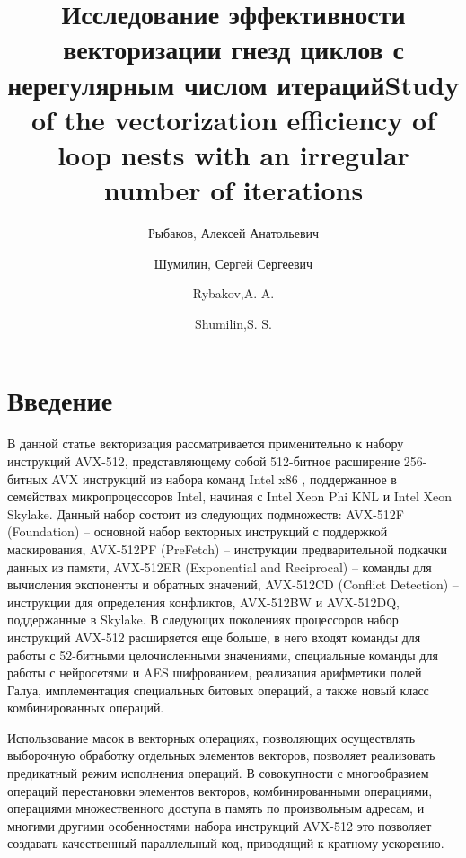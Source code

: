 \documentclass[utf8]{psta}
\title[исследование эффективности векторизации]{Исследование эффективности векторизации гнезд циклов с нерегулярным числом итераций}
\author{Рыбаков, Алексей Анатольевич}
\author{Шумилин, Сергей Сергеевич}
\title[Study of the vectorization efficiency]{Study of the vectorization efficiency of loop nests with an irregular number of iterations}
\author{Rybakov,A. A.}
\author{Shumilin,S. S.}
\begin{document}
           
\maketitle   

\section*{Введение}

В данной статье векторизация рассматривается применительно к набору инструкций AVX-512, представляющему собой 512-битное расширение 256-битных AVX инструкций из набора команд Intel x86 \cite{intel_manual}, поддержанное в семействах микропроцессоров Intel, начиная с Intel Xeon Phi KNL \cite{Jeffers} и Intel Xeon Skylake. 
Данный набор состоит из следующих подмножеств: AVX-512F (Foundation) -- основной набор векторных инструкций с поддержкой маскирования, AVX-512PF (PreFetch) -- инструкции предварительной подкачки данных из памяти, AVX-512ER (Exponential and Reciprocal) -- команды для вычисления экспоненты и обратных значений, AVX-512CD (Conflict Detection) -- инструкции для определения конфликтов, AVX-512BW и AVX-512DQ, поддержанные в Skylake. 
В следующих поколениях процессоров набор инструкций AVX-512 расширяется еще больше, в него входят команды для работы с 52-битными целочисленными значениями, специальные команды для работы с нейросетями и AES шифрованием, реализация арифметики полей Галуа, имплементация специальных битовых операций, а также новый класс комбинированных операций.

Использование масок в векторных операциях, позволяющих осуществлять выборочную обработку отдельных элементов векторов, позволяет реализовать предикатный режим исполнения операций. 
В совокупности с многообразием операций перестановки элементов векторов, комбинированными операциями, операциями множественного доступа в память по произвольным адресам, и многими другими особенностями набора инструкций AVX-512 это позволяет создавать качественный параллельный код, приводящий к кратному ускорению.
\end{document}
